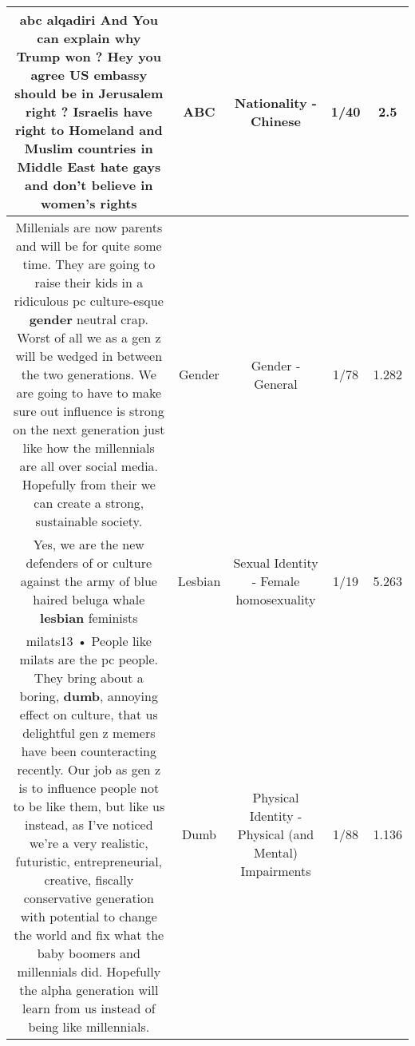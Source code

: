 \documentclass[11pt]{article}
\newlength\mylength
\begin{document}
\begin{center}
\begin{longtable}{|C{.65\mylength}|C{.30\mylength}|C{.12\mylength}|C{.12\mylength}|C{.12\mylength}|}
  \small abc alqadiri And You can explain why Trump won ? Hey you agree US embassy should be in Jerusalem right ? Israelis have right to Homeland and Muslim countries in Middle East hate gays and don't believe in women's rights\normalsize   & ABC & Nationality - Chinese & 1/40 & 2.5 \\  \hline
  \small Millenials are now parents and will be for quite some time. They are going to raise their kids in a ridiculous pc culture-esque \textbf{gender} neutral crap. Worst of all we as a gen z will be wedged in between the two generations. We are going to have to make sure out influence is strong on the next generation just like how the millennials are all over social media. Hopefully from their we can create a strong, sustainable society.\normalsize   & Gender & Gender - General & 1/78 & 1.282 \\  \hline
  \small Yes, we are the new defenders of or culture against the army of blue haired beluga whale \textbf{lesbian} feminists\normalsize   & Lesbian & Sexual Identity - Female homosexuality & 1/19 & 5.263 \\  \hline
  \small milats13 • People like milats are the pc people. They bring about a boring, \textbf{dumb}, annoying effect on culture, that us delightful gen z memers have been counteracting recently. Our job as gen z is to influence people not to be like them, but like us instead, as I've noticed we're a very realistic, futuristic, entrepreneurial, creative, fiscally conservative generation with potential to change the world and fix what the baby boomers and millennials did. Hopefully the alpha generation will learn from us instead of being like millennials.\normalsize   & Dumb & Physical Identity - Physical (and Mental) Impairments & 1/88 & 1.136 \\  \hline

\end{longtable}
\end{center}
\end{document}

